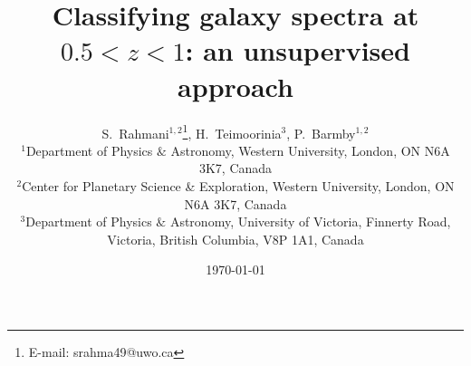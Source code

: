 \documentclass[useAMS,usenatbib]{mn2e}
\begin{document}

\title[Classifying high-$z$ galaxy spectra]{Classifying galaxy spectra at $0.5<z<1$: an unsupervised approach}
\date{\today}
\author[S.~Rahmani, H.~Teimoorinia and P.~Barmby]{S.~Rahmani$^{1,2}$\thanks{E-mail:
srahma49@uwo.ca}, H.~Teimoorinia$^{3}$, P.~Barmby$^{1,2}$\\
$^{1}$Department of Physics $\&$ Astronomy, Western University, London, ON N6A 3K7, Canada\\
$^{2}$Center for Planetary Science \& Exploration, Western University, London, ON N6A 3K7, Canada\\
$^{3}$Department of Physics $\&$ Astronomy, University of Victoria, Finnerty Road, Victoria, British Columbia, V8P 1A1, Canada}
\maketitle

\end{document}
